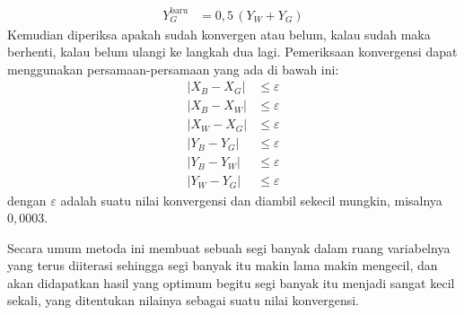 \begin{enumerate}[label=\arabic*.]
\begin{align}
      Y_G^{\text{baru}} &= 0{,}5\,(Y_W + Y_G) \label{eq:2-35}
      \end{align}
      Kemudian diperiksa apakah sudah konvergen atau belum, kalau sudah
      maka berhenti, kalau belum ulangi ke langkah dua lagi.
      Pemeriksaan konvergensi dapat menggunakan persamaan-persamaan yang
      ada di bawah ini:
      \begin{align}
      |X_B - X_G| &\le \varepsilon \label{eq:2-36a}\\
      |X_B - X_W| &\le \varepsilon \label{eq:2-36b}\\
      |X_W - X_G| &\le \varepsilon \label{eq:2-36c}\\
      |Y_B - Y_G| &\le \varepsilon \label{eq:2-36d}\\
      |Y_B - Y_W| &\le \varepsilon \label{eq:2-36e}\\
      |Y_W - Y_G| &\le \varepsilon \label{eq:2-36f}
      \end{align}
      dengan $\varepsilon$ adalah suatu nilai konvergensi dan diambil
      sekecil mungkin, misalnya $0{,}0003$.
\end{enumerate}

Secara umum metoda ini membuat sebuah segi banyak dalam ruang variabelnya
yang terus diiterasi sehingga segi banyak itu makin lama makin mengecil,
dan akan didapatkan hasil yang optimum begitu segi banyak itu menjadi
sangat kecil sekali, yang ditentukan nilainya sebagai suatu nilai
konvergensi.
